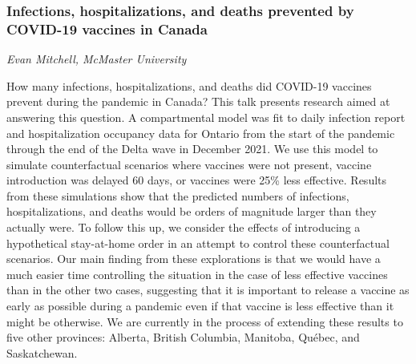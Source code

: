 \subsubsection*{Infections, hospitalizations, and deaths prevented by COVID-19 vaccines in Canada}
\textit{Evan Mitchell, McMaster University}

How many infections, hospitalizations, and deaths did COVID-19 vaccines prevent during the pandemic in Canada? This talk presents research aimed at answering this question. A compartmental model was fit to daily infection report and hospitalization occupancy data for Ontario from the start of the pandemic through the end of the Delta wave in December 2021. We use this model to simulate counterfactual scenarios where vaccines were not present, vaccine introduction was delayed 60 days, or vaccines were 25\% less effective. Results from these simulations show that the predicted numbers of infections, hospitalizations, and deaths would be orders of magnitude larger than they actually were. To follow this up, we consider the effects of introducing a hypothetical stay-at-home order in an attempt to control these counterfactual scenarios. Our main finding from these explorations is that we would have a much easier time controlling the situation in the case of less effective vaccines than in the other two cases, suggesting that it is important to release a vaccine as early as possible during a pandemic even if that vaccine is less effective than it might be otherwise. We are currently in the process of extending these results to five other provinces: Alberta, British Columbia, Manitoba, Qu\'{e}bec, and Saskatchewan.

